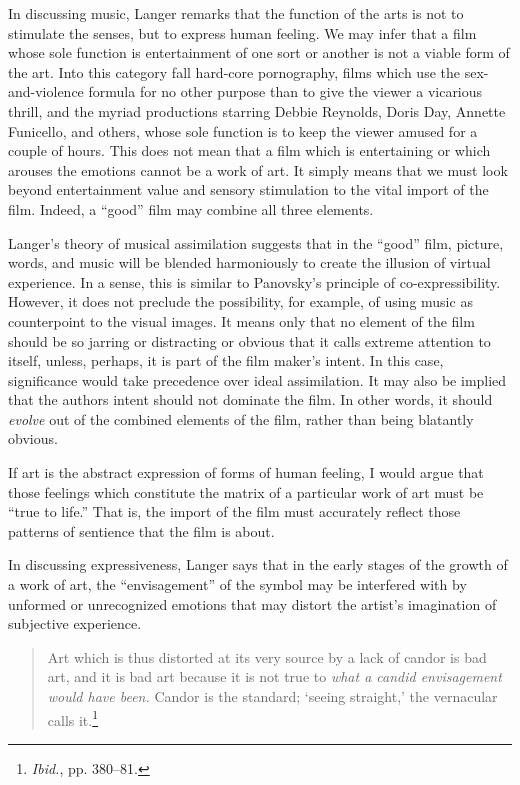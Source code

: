 \documentclass{tufte-handout}
\begin{document}
In discussing music, Langer remarks that the function of the arts is not
to stimulate the senses, but to express human feeling. We may infer that
a film whose sole function is entertainment of one sort or another is
not a viable form of the art. Into this category fall hard-core
pornography, films which use the sex-and-violence formula for no other
purpose than to give the viewer a vicarious thrill, and the myriad
productions starring Debbie Reynolds, Doris Day, Annette Funicello, and
others, whose sole function is to keep the viewer amused for a couple of
hours. This does not mean that a film which is entertaining or which
arouses the emotions cannot be a work of art. It simply means that we
must look beyond entertainment value and sensory stimulation to the
vital import of the film. Indeed, a ``good'' film may combine all three
elements.

Langer's theory of musical assimilation suggests that in the ``good''
film, picture, words, and music will be blended harmoniously to create
the illu­sion of virtual experience. In a sense, this is similar to
Panovsky's principle of co-expressibility. However, it does not preclude
the possibility, for ex­ample, of using music as counterpoint to the
visual images. It means only that no element of the film should be so
jarring or distracting or obvious that it calls extreme attention to
itself, unless, perhaps, it is part of the film maker's intent. In this
case, significance would take precedence over ideal assimilation. It may
also be implied that the author\textquotesingle s intent should not
dominate the film. In other words, it should \emph{evolve} out of the
combined elements of the film, rather than being blatantly obvious.

If art is the abstract expression of forms of human feeling, I would
argue that those feelings which constitute the matrix of a particular
work of art must be ``true to life.'' That is, the import of the film
must accurately re­flect those patterns of sentience that the film is
about.

In discussing expressiveness, Langer says that in the early stages of
the growth of a work of art, the ``envisagement'' of the symbol may be
inter­fered with by unformed or unrecognized emotions that may distort
the artist's imagination of subjective experience.

\begin{quote}
Art which is thus distorted at its very source by a lack of candor is
bad art, and it is bad art because it is not true to \emph{what a candid
envisagement would have been.} Candor is the standard; `seeing
straight,' the vernacular calls it.\footnote{\emph{Ibid.}, pp. 380--81.}
\end{quote}
\end{document}
